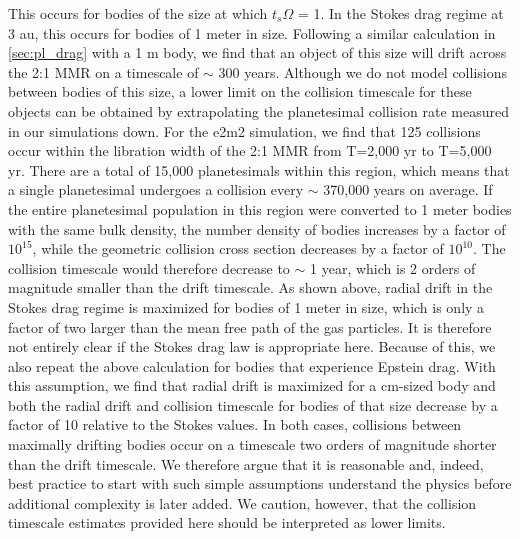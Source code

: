 This occurs for bodies of the size at which $t_{s} \Omega$ = 1. In the Stokes drag regime at 3 au, this occurs for bodies of 1 
meter in size. Following a similar calculation in \ref{sec:pl_drag} with a 1 m body, we find that an object of this size will drift 
across the 2:1 MMR on a timescale of $\sim$ 300 years. Although we do not model collisions between bodies of this size, a 
lower limit on the collision timescale for these objects can be obtained by extrapolating the planetesimal collision rate measured 
in our simulations down. For the e2m2 simulation, we find that 125 collisions occur within the libration width of the 2:1 MMR from 
T=2,000 yr to  T=5,000 yr. There are a total of 15,000 planetesimals within this region, which means that a single planetesimal 
undergoes a collision every $\sim$ 370,000 years on average. If the entire planetesimal population in this region were converted 
to 1 meter bodies with the same bulk density, the number density of bodies increases by a factor of $10^{15}$, while the 
geometric collision cross section decreases by a factor of $10^{10}$. The collision timescale would therefore decrease to $\sim$ 
1 year, which is 2 orders of magnitude smaller than the drift timescale. As shown above, radial drift in the Stokes drag regime is 
maximized for bodies of 1 meter in size, which is only a factor of two larger than the mean free path of the gas particles. It is 
therefore not entirely clear if the Stokes drag law is appropriate here. Because of this, we also repeat the above calculation for 
bodies that experience Epstein drag. With this assumption, we find that radial drift is maximized for a cm-sized body and both 
the radial drift and collision timescale for bodies of that size decrease by a factor of 10 relative to the Stokes values. In both 
cases, collisions between maximally drifting bodies occur on a timescale two orders of magnitude shorter than the drift 
timescale. We therefore argue that it is reasonable and, indeed, best practice to start with such simple assumptions understand 
the physics before additional complexity is later added. We caution, however, that the collision timescale estimates provided 
here should be interpreted as lower limits.


